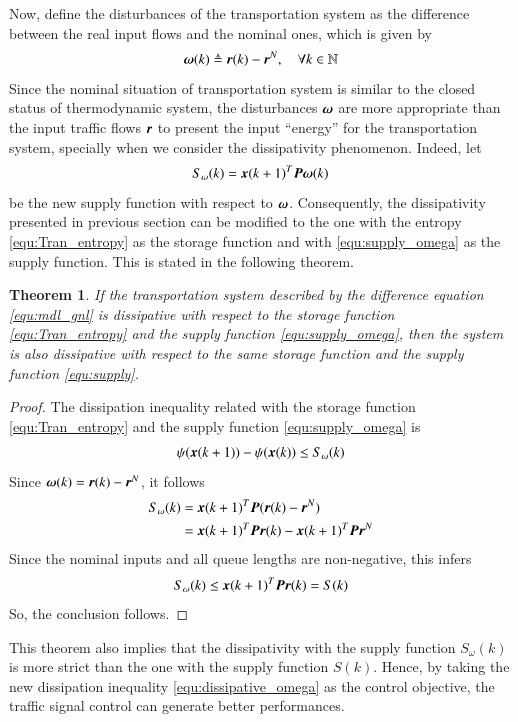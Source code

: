 \documentclass[preprint,authoryear,12pt]{elsarticle}
\renewcommand{\vec}[1]{\mbox{\boldmath$#1$}}
\newcommand{\mat}[1]{\mbox{\boldmath$#1$}}
\newtheorem{thm}{Theorem}
\begin{document}
Now, define the disturbances of the transportation system as the
difference between the real input flows and the nominal ones, which
is given by
\begin{equation}
\vec{\omega}(k)\triangleq\vec{r}(k)-\vec{r}^N, \quad \forall k\in\mathbb{N}
\end{equation}
Since the nominal situation of transportation system is similar to
the closed status of thermodynamic system, the disturbances
$\vec{\omega}$ are more appropriate than the input traffic flows
$\vec{r}$ to present the input ``energy'' for the transportation
system, specially when we consider the dissipativity phenomenon.
Indeed, let
\begin{equation}\label{equ:supply_omega}
  S_\omega(k) = \vec{x}(k+1)^T \mat{P} \vec{\omega}(k)
\end{equation}
be the new supply function with respect to $\vec{\omega}$.
Consequently, the dissipativity presented in previous section can be
modified to the one with the entropy \eqref{equ:Tran_entropy} as the
storage function and with \eqref{equ:supply_omega} as the supply
function. This is stated in the following theorem.

\begin{thm}
If the transportation system described by the difference equation
\eqref{equ:mdl_gnl} is dissipative with respect to the storage
function \eqref{equ:Tran_entropy} and the supply function
\eqref{equ:supply_omega}, then the system is also dissipative with
respect to the same storage function and the supply function
\eqref{equ:supply}.
\end{thm}
\begin{proof}
The dissipation inequality related with the storage function
\eqref{equ:Tran_entropy} and the supply function
\eqref{equ:supply_omega} is
\begin{equation}\label{equ:dissipative_omega}
  \psi(\vec{x}(k+1))-\psi(\vec{x}(k)) \leq S_\omega(k)
\end{equation}
Since $\vec{\omega}(k)=\vec{r}(k)-\vec{r}^N$, it follows
\begin{align*}
S_\omega(k) &= \vec{x}(k+1)^T \mat{P} (\vec{r}(k)-\vec{r}^N)\\
    &= \vec{x}(k+1)^T \mat{P} \vec{r}(k)-\vec{x}(k+1)^T\mat{P}\vec{r}^N
\end{align*}
Since the nominal inputs and all queue lengths are non-negative, this
infers
$$S_\omega(k)\leq \vec{x}(k+1)^T \mat{P} \vec{r}(k) = S(k)$$
So, the conclusion follows.
\end{proof}
This theorem also implies that the dissipativity with the supply
function $S_\omega(k)$ is more strict than the one with the supply
function $S(k)$. Hence, by taking the new dissipation inequality
\eqref{equ:dissipative_omega} as the control objective, the traffic
signal control can generate better performances.
\end{document}
